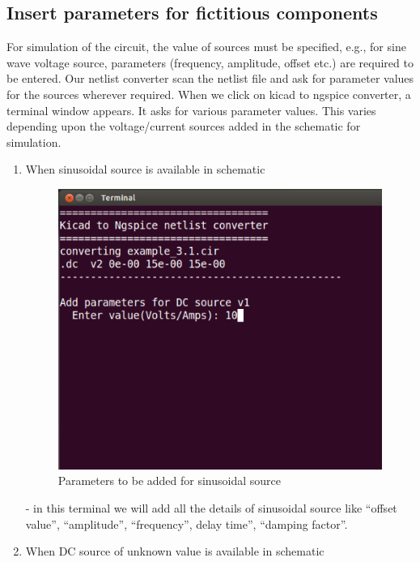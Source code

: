 \subsection{Insert parameters for fictitious components}
For simulation of the circuit, the value of sources must be specified, e.g., for sine wave voltage source, parameters (frequency, amplitude, offset etc.) are required to be 
entered. Our netlist converter scan the netlist file and ask for parameter values for the sources wherever required. 
When we click on kicad to ngspice converter, a terminal window appears. It asks for various parameter values. This varies depending upon the voltage/current sources added in the schematic for simulation.
\begin{enumerate}
\item When sinusoidal source is available in schematic
\begin{figure}
\centering
\includegraphics[width=\textwidth]{figures/9}
\caption{Parameters to be added for sinusoidal source}
\label{9}
\end{figure}
- in this terminal we will add all the details of sinusoidal source like “offset value”, “amplitude”, “frequency”, delay time”, “damping factor”.
\item When DC source of unknown value is available in schematic
\begin{figure}
\centering

\end{figure}
\end{enumerate}
